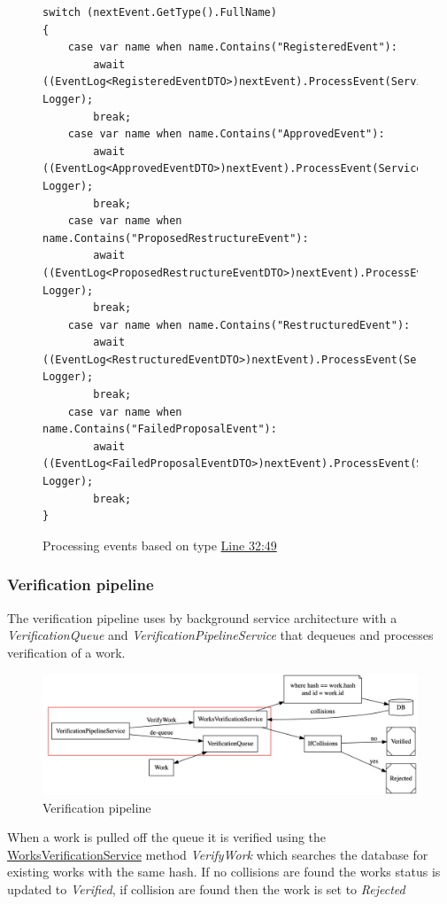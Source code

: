 \documentclass[12pt]{article}
\begin{document}
\begin{figure}[H]
\caption{Processing events based on type \href{https://github.com/MrHarrisonBarker/CRPL/blob/main/CRPL.Web/Services/Background/EventProcessingService.cs}{Line 32:49}}
\centering
\begin{lstlisting}[language=CSharp]
switch (nextEvent.GetType().FullName)
{
	case var name when name.Contains("RegisteredEvent"):
		await ((EventLog<RegisteredEventDTO>)nextEvent).ProcessEvent(ServiceProvider, Logger);
		break;
	case var name when name.Contains("ApprovedEvent"):
		await ((EventLog<ApprovedEventDTO>)nextEvent).ProcessEvent(ServiceProvider, Logger);
		break;
	case var name when name.Contains("ProposedRestructureEvent"):
		await ((EventLog<ProposedRestructureEventDTO>)nextEvent).ProcessEvent(ServiceProvider, Logger);
		break;
	case var name when name.Contains("RestructuredEvent"):
		await ((EventLog<RestructuredEventDTO>)nextEvent).ProcessEvent(ServiceProvider, Logger);
		break;
	case var name when name.Contains("FailedProposalEvent"):
		await ((EventLog<FailedProposalEventDTO>)nextEvent).ProcessEvent(ServiceProvider, Logger);
		break;
}
\end{lstlisting}
\end{figure}

\subsubsection{Verification pipeline}

The verification pipeline uses by background service architecture with a \textit{VerificationQueue} and \textit{VerificationPipelineService} that dequeues and processes verification of a work. 

\begin{figure}[H]
\caption{Verification pipeline}
\centering
\includegraphics[width=\textwidth,height=\textheight,keepaspectratio]{images/operational/verification-pipe}
\end{figure}

When a work is pulled off the queue it is verified using the \href{https://github.com/MrHarrisonBarker/CRPL/blob/main/CRPL.Web/Services/WorksVerificationService.cs}{WorksVerificationService} method \textit{VerifyWork} which searches the database for existing works with the same hash. If no collisions are found the works status is updated to \textit{Verified}, if collision are found then the work is set to \textit{Rejected}
\end{document}
